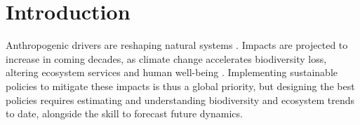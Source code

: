 \documentclass[11pt]{article}
\begin{document}
\begin{abstract}
\end{abstract}

\linenumbers

\section{Introduction}

Anthropogenic drivers are reshaping natural systems \citep{Diaz2019}. Impacts are projected to increase in coming decades, as climate change accelerates biodiversity loss, altering ecosystem services and human well-being \citep{IPBES2019}.
Implementing sustainable policies to mitigate these impacts is thus a global priority, but designing the best policies requires estimating and understanding biodiversity and ecosystem trends to date, alongside the skill to forecast future dynamics. %
\end{document}
